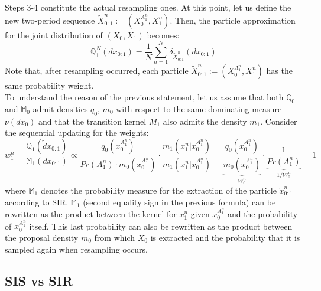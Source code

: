 \documentclass[
]{book}
\theoremstyle{break}
\theoremstyle{nonumberplain}
\begin{document}
Steps 3-4 constitute the actual resampling ones. At this point, let us
define the new two-period sequence
\(\tilde X_{0:1}^n:=(X_0^{A_1^n},X_1^n)\). Then, the particle
approximation for the joint distribution of \((X_0,X_1)\) becomes:
\begin{equation*}
     \mathbb Q_{1}^N(dx_{0:1})=\frac{1}{N}\sum_{n=1}^N\delta_{\tilde X_{0:1}^n}(dx_{0:1})
\end{equation*} Note that, after resampling occurred, each particle
\(\tilde X_{0:1}^n:=(X_0^{A_1^n},X_1^n)\) has the same probability
weight.\\
To understand the reason of the previous statement, let us assume that
both \(\mathbb Q_0\) and \(\mathbb M_0\) admit densities \(q_0\),
\(m_0\) with respect to the same dominating measure \(\nu(dx_0)\) and
that the transition kernel \(M_1\) also admits the density \(m_1\).
Consider the sequential updating for the weights: \begin{equation}
    w^n_1=\frac{\mathbb Q_1(\tilde dx_{0:1})}{\mathbb M_1(dx_{0:1})}\propto \frac{q_0(x_0^{A_1^n})}{Pr(A_1^n)\cdot m_0(x_0^{A_1^n})}\cdot \frac{m_1(x_1^n|x_0^{A_1^n})}{m_1(x_1^n|x_0^{A_1^n})}
=\underbrace{\frac{q_0(x_0^{A_1^n})}{ m_0(x_0^{A_1^n})}}_{W_0^n}\cdot \underbrace{\frac{1}{Pr(A_1^n)}}_{1/W_0^n}=1\label{sis_update}
\end{equation} where \(\mathbb M_1\) denotes the probability measure for
the extraction of the particle \(\tilde x_{0:1}^n\) according to SIR.
\(\mathbb M_1\) (second equality sign in the previous formula) can be
rewritten as the product between the kernel for \(x_1^n\) given
\(x_0^{A_1^n}\) and the probability of \(x_0^{A_1^n}\) itself. This last
probability can also be rewritten as the product between the proposal
density \(m_0\) from which \(X_0\) is extracted and the probability that
it is sampled again when resampling occurs.

\subsection{SIS vs SIR}
\end{document}
